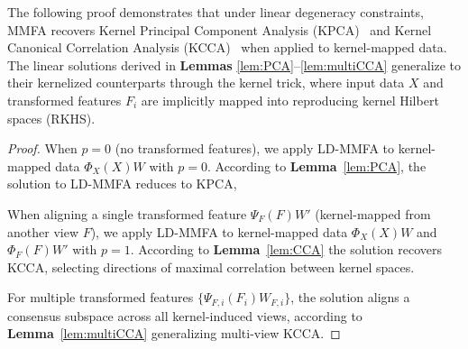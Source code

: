 The following proof demonstrates that under linear degeneracy constraints, MMFA recovers Kernel Principal Component Analysis (KPCA)~\cite{kpca} and Kernel Canonical Correlation Analysis (KCCA)~\cite{fukumizu2007statistical} when applied to kernel-mapped data. The linear solutions derived in \textbf{Lemmas} \ref{lem:PCA}–\ref{lem:multiCCA} generalize to their kernelized counterparts through the kernel trick, where input data \(X\) and transformed features \(F_i\) are implicitly mapped into reproducing kernel Hilbert spaces (RKHS).


\begin{proof}
When \(p = 0\) (no transformed features), we apply LD-MMFA to kernel-mapped data \(\Phi_X(X)W\) with \(p = 0\). According to \textbf{Lemma}~\ref{lem:PCA}, the solution to LD-MMFA reduces to KPCA,

When aligning a single transformed feature \(\Psi_F(F)W'\) (kernel-mapped from another view \(F\)), we apply LD-MMFA to kernel-mapped data \(\Phi_X(X)W\) and \(\Phi_F(F)W'\) with \(p = 1\). According to \textbf{Lemma}~\ref{lem:CCA} the solution recovers KCCA, selecting directions of maximal correlation between kernel spaces.

For multiple transformed features \(\{\Psi_{F,i}(F_i)W_{F,i}\}\), the solution aligns a consensus subspace across all kernel-induced views, according to \textbf{Lemma}~\ref{lem:multiCCA} generalizing multi-view KCCA.
\end{proof}
